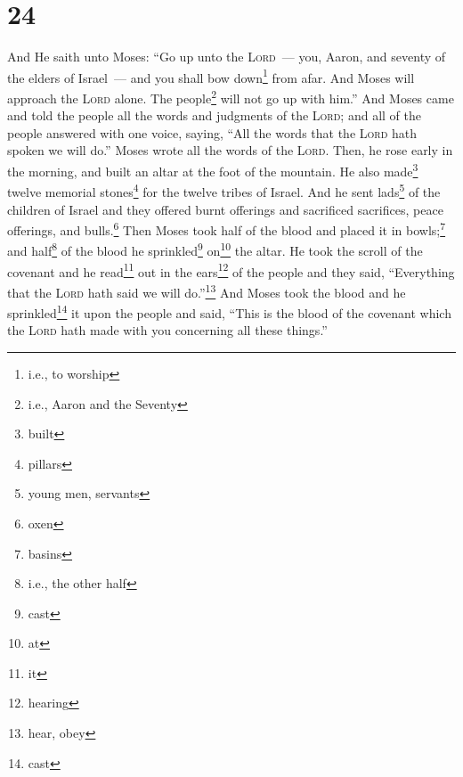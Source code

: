 \section{24}\label{Exodus 24}
\begin{enumerate}[align=center]
     And He saith unto Moses: ``Go up unto the \textsc{Lord}~--- you, Aaron, and seventy of the elders of Israel~--- and you shall bow down\footnote{i.e., to worship} from afar.%
     And Moses will approach the \textsc{Lord} alone. The people\footnote{i.e., Aaron and the Seventy} will not go up with him.''%
     And Moses came and told the people all the words and judgments of the \textsc{Lord}; and all of the people answered with one voice, saying, ``All the words that the \textsc{Lord} hath spoken we will do.''%
     Moses wrote all the words of the \textsc{Lord}. Then, he rose early in the morning, and built an altar at the foot of the mountain. He also made\footnote{built} twelve memorial stones\footnote{pillars} for the twelve tribes of Israel.%
     And he sent lads\footnote{young men, servants} of the children of Israel and they offered burnt offerings and sacrificed sacrifices, peace offerings, and bulls.\footnote{oxen}%
     Then Moses took half of the blood and placed it in bowls;\footnote{basins} and half\footnote{i.e., the other half} of the blood he sprinkled\footnote{cast} on\footnote{at} the altar.%
     He took the scroll of the covenant and he read\footnote{it} out in the ears\footnote{hearing} of the people and they said, ``Everything that the \textsc{Lord} hath said we will do.''\footnote{hear, obey}%
     And Moses took the blood and he sprinkled\footnote{cast} it upon the people and said, ``This is the blood of the covenant which the \textsc{Lord} hath made with you concerning all these things.''%
\end{enumerate}
